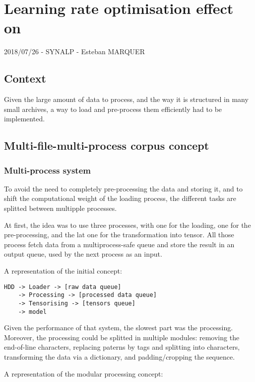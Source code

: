 \section*{Learning rate optimisation effect
on}

2018/07/26 - SYNALP - Esteban MARQUER

\subsection{Context}

Given the large amount of data to process, and the way it is structured
in many small archives, a way to load and pre-process them efficiently
had to be implemented.

\subsection{Multi-file-multi-process corpus
concept}

\subsubsection{Multi-process system}

To avoid the need to completely pre-processing the data and storing it,
and to shift the computational weight of the loading process, the
different tasks are splitted between multipple processes.

At first, the idea was to use three processes, with one for the loading,
one for the pre-processing, and the lat one for the transformation into
tensor. All those process fetch data from a multiprocess-safe queue and
store the result in an output queue, used by the next process as an
input.

A representation of the initial concept:

\begin{lstlisting}
HDD -> Loader -> [raw data queue]
    -> Processing -> [processed data queue]
    -> Tensorising -> [tensors queue]
    -> model
\end{lstlisting}

Given the performance of that system, the slowest part was the
processing. Moreover, the processing could be splitted in multiple
modules: removing the end-of-line characters, replacing paterns by tags
and splitting into characters, transforming the data via a dictionary,
and padding/cropping the sequence.

A representation of the modular processing concept:

